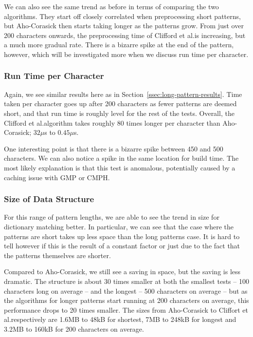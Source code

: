 \documentclass[ %
                    author={Dominic Joseph Moylett},
                    degree={MEng},
                     title={Dictionary Matching with Fingerprints},
                  subtitle={An Empirical Analysis},
                      type={research},
                      year={2015} ]{dissertation}
\begin{document}
We can also see the same trend as before in terms of comparing the two algorithms. They start off closely correlated when preprocessing short patterns, but Aho-Corasick then starts taking longer as the patterns grow. From just over 200 characters onwards, the preprocessing time of Clifford et al.\@ is increasing, but a much more gradual rate. There is a bizarre spike at the end of the pattern, however, which will be investigated more when we discuss run time per character.

\subsubsection{Run Time per Character}

Again, we see similar results here as in Section~\ref{ssec:long-pattern-results}. Time taken per character goes up after 200 characters as fewer patterns are deemed short, and that run time is roughly level for the rest of the tests. Overall, the Clifford et al.\@ algorithm takes roughly 80 times longer per character than Aho-Corasick; $32\mu$s to $0.45\mu$s.

One interesting point is that there is a bizarre spike between 450 and 500 characters. We can also notice a spike in the same location for build time. The most likely explanation is that this test is anomalous, potentially caused by a caching issue with GMP or CMPH.

\subsubsection{Size of Data Structure}

For this range of pattern lengths, we are able to see the trend in size for dictionary matching better. In particular, we can see that the case where the patterns are short takes up less space than the long patterns case. It is hard to tell however if this is the result of a constant factor or just due to the fact that the patterns themselves are shorter.

Compared to Aho-Corasick, we still see a saving in space, but the saving is less dramatic. The structure is about 30 times smaller at both the smallest tests -- 100 characters long on average -- and the longest -- 500 characters on average -- but as the algorithms for longer patterns start running at 200 characters on average, this performance drops to 20 times smaller. The sizes from Aho-Corasick to Cliffort et al.\@ respectively are 1.6MB to 48kB for shortest, 7MB to 248kB for longest and 3.2MB to 160kB for 200 characters on average.
\end{document}
